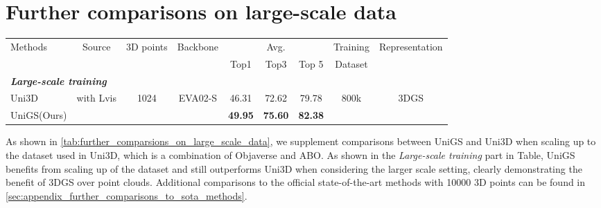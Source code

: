 \section{Further comparisons on large-scale data}
\begin{table*}[t]
		\centering
  \caption{\textbf{Experimental results of large scale training on Objaverse-LVIS zero-shot classification. Avg.: }the mean average classification accuracy. All methods are trained from scratch.}
  \setlength{\tabcolsep}{3pt}
 \begin{tabularx}{\textwidth}{ l | c c c | c c c | c c }
\toprule
\multirow{2}{*}{Methods} & \multirow{2}{*}{Source} & \multirow{2}{*}{3D points} & \multirow{2}{*}{Backbone}  & \multicolumn{3}{c|}{Avg.} & Training & \multirow{2}{*}{Representation} \\
  & & & & Top1 & Top3 & Top 5 & Dataset & \\
  
 \midrule  \midrule
    \multicolumn{3}{l}{\textit{\textbf{Large-scale training}}} \\
    \midrule
Uni3D & \multirow{2}{*}{with Lvis} & \multirow{2}{*}{1024} & \multirow{2}{*}{EVA02-S} & 46.31 & 72.62 & 79.78 & \multirow{2}{*}{800k}  & \multirow{2}{*}{3DGS}\\
UniGS(Ours) & & & & \textbf{49.95} & \textbf{75.60} & \textbf{82.38} & & \\
\bottomrule
\end{tabularx}
    \vspace{-1mm}
  \label{tab:further_comparsions_on_large_scale_data}
  \vspace{-3mm}
\end{table*}

As shown in \cref{tab:further_comparsions_on_large_scale_data}, we supplement comparisons between UniGS and Uni3D when scaling up to the dataset used in Uni3D, which is a combination of Objaverse and ABO. As shown in the \emph{Large-scale training} part in Table, UniGS benefits from scaling up of the dataset and still outperforms Uni3D when considering the larger scale setting, clearly demonstrating the benefit of 3DGS over point clouds. Additional comparisons to the official state-of-the-art methods with 10000 3D points can be found in \cref{sec:appendix_further_comparisons_to_sota_methods}.


